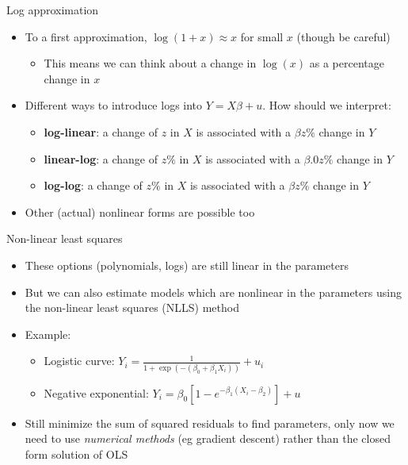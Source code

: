 \documentclass[aspectratio=169]{beamer}
\begin{document}
\begin{frame}{Log approximation}
    \begin{itemize}
        \item To a first approximation, $\log(1+x) \approx x$ for small $x$ (though be careful)
        \begin{itemize}
            \item This means we can think about a change in $\log(x)$ as a percentage change in $x$
        \end{itemize}
        \item Different ways to introduce logs into $Y=X\beta + u$. How should we interpret:
        \begin{itemize}
            \item \textbf{log-linear}: a change of $z$ in $X$ is associated with a $\beta z \%$ change in $Y$
            \item \textbf{linear-log}: a change of $z\%$ in $X$ is associated with a $\beta .0z \%$ change in $Y$
            \item \textbf{log-log}: a change of $z\%$ in $X$ is associated with a $\beta z \%$ change in $Y$
        \end{itemize}
        \item Other (actual) nonlinear forms are possible too
    \end{itemize}
\end{frame}

\begin{frame}{Non-linear least squares}
    \begin{itemize}
        \item These options (polynomials, logs) are still linear in the parameters
        \item But we can also estimate models which are nonlinear in the parameters using the non-linear least squares (NLLS) method
        \item Example:
        \begin{itemize}
            \item Logistic curve: $Y_i=\frac{1}{1+\exp \left(-\left(\beta_0+\beta_1 X_i\right)\right)}+u_i$
            \item Negative exponential: $Y_i=\beta_0\left[1-e^{-\beta_1\left(X_i-\beta_2\right)}\right]+u$
        \end{itemize}
        \item Still minimize the sum of squared residuals to find parameters, only now we need to use \textit{numerical methods} (eg gradient descent) rather than the closed form solution of OLS
    \end{itemize}
\end{frame}
\end{document}
